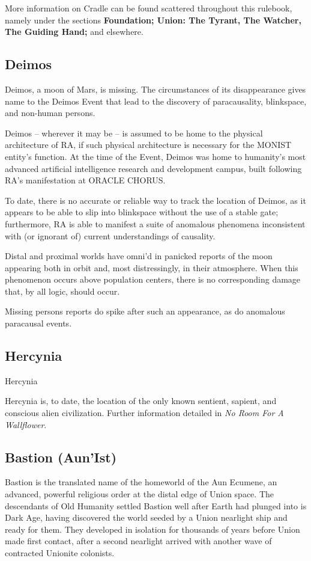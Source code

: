 More information on Cradle can be found scattered throughout this rulebook, namely under the
sections \textbf{Foundation; Union: The Tyrant, The Watcher, The Guiding Hand;} and elsewhere.

\subsection{Deimos}

Deimos, a moon of Mars, is missing. The circumstances of its disappearance gives name to the
Deimos Event that lead to the discovery of paracausality, blinkspace, and non-human persons.

Deimos -- wherever it may be -- is assumed to be home to the physical architecture of RA, if
such physical architecture is necessary for the MONIST entity’s function. At the time of the
Event, Deimos was home to humanity’s most advanced artificial intelligence research and
development campus, built following RA’s manifestation at ORACLE CHORUS.

To date, there is no accurate or reliable way to track the location of Deimos, as it appears to be
able to slip into blinkspace without the use of a stable gate; furthermore, RA is able to manifest a
suite of anomalous phenomena inconsistent with (or ignorant of) current understandings of
causality.

Distal and proximal worlds have omni’d in panicked reports of the moon appearing both in orbit
and, most distressingly, in their atmosphere. When this phenomenon occurs above population
centers, there is no corresponding damage that, by all logic, should occur.

Missing persons reports do spike after such an appearance, as do anomalous paracausal
events.

\subsection{Hercynia}
Hercynia

Hercynia is, to date, the location of the only known sentient, sapient, and conscious alien
civilization. Further information detailed in \textit{No Room For A Wallflower}.

\subsection{Bastion (Aun’Ist)}

Bastion is the translated name of the homeworld of the Aun Ecumene, an advanced, powerful
religious order at the distal edge of Union space. The descendants of Old Humanity settled
Bastion well after Earth had plunged into is Dark Age, having discovered the world seeded by a
Union nearlight ship and ready for them. They developed in isolation for thousands of years
before Union made first contact, after a second nearlight arrived with another wave of contracted
Unionite colonists.

